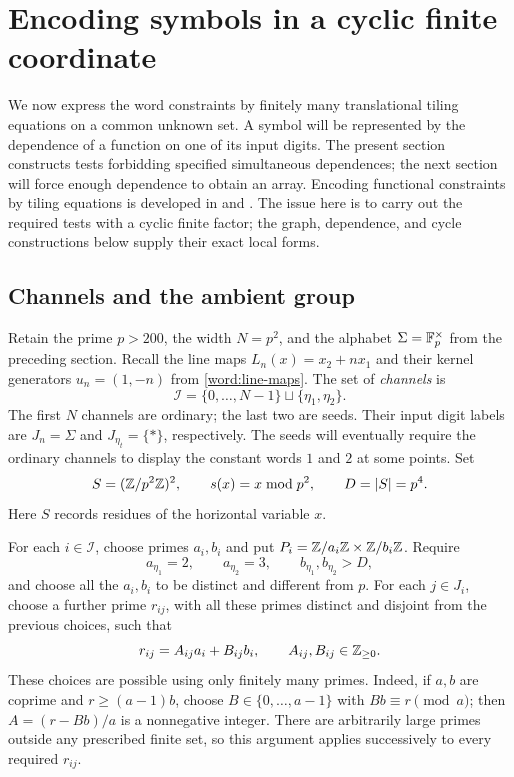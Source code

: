 \section{Encoding symbols in a cyclic finite coordinate}
\label{sec:encoding}

We now express the word constraints by finitely many translational tiling
equations on a common unknown set.  A symbol will be represented by the
dependence of a function on one of its input digits.  The present section
constructs tests forbidding specified simultaneous dependences; the next
section will force enough dependence to obtain an array. Encoding
functional constraints by tiling equations is developed in
\citet[Sections~4--8]{GTTwoTiles} and
\citet[Theorem~4.1]{GTPeriodic}. The issue here is to carry out the
required tests with a cyclic finite factor; the graph, dependence,
and cycle constructions below supply their exact local forms.

\subsection{Channels and the ambient group}

Retain the prime $p>200$, the width $N=p^2$, and the alphabet
$\Sigma=\mathbb F_p^\times$ from the preceding section.  Recall the line maps
$L_n(x)=x_2+nx_1$ and their kernel generators $u_n=(1,-n)$ from
\eqref{word:line-maps}.  The set of
\emph{channels} is
\[
 \mathcal I=\{0,\ldots,N-1\}\sqcup\{\eta_1,\eta_2\}.
\]
The first $N$ channels are ordinary; the last two are seeds.  Their input
digit labels are $J_n=\Sigma$ and $J_{\eta_t}=\{*\}$, respectively.
The seeds will eventually require the ordinary channels to display the
constant words $1$ and $2$ at some points.  Set
\[
 S=(\mathbb Z/p^2\mathbb Z)^2,\qquad s(x)=x\bmod p^2,\qquad D=\lvert S\rvert=p^4.
\]
Here $S$ records residues of the horizontal variable $x$.

For each $i\in\mathcal I$, choose primes $a_i,b_i$ and put
$P_i=\mathbb Z/a_i\mathbb Z\times\mathbb Z/b_i\mathbb Z$.  Require
\[
 a_{\eta_1}=2,\qquad a_{\eta_2}=3,\qquad
 b_{\eta_1},b_{\eta_2}>D,
\]
and choose all the $a_i,b_i$ to be distinct and different from $p$.
For each $j\in J_i$, choose a further prime $r_{ij}$, with all these
primes distinct and disjoint from the previous choices, such that
\begin{equation}
 r_{ij}=A_{ij}a_i+B_{ij}b_i,
 \qquad A_{ij},B_{ij}\in\mathbb Z_{\geq0}.
 \label{enc:digit-partition}
\end{equation}
These choices are possible using only finitely many primes.  Indeed, if
$a,b$ are coprime and $r\geq(a-1)b$, choose $B\in\{0,\ldots,a-1\}$
with $Bb\equiv r\pmod a$; then $A=(r-Bb)/a$ is a nonnegative integer.
There are arbitrarily large primes outside any prescribed finite set,
so this argument applies successively to every required $r_{ij}$.

